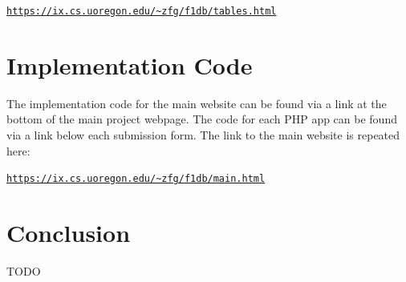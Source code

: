 \documentclass{article} %
\begin{document}
\noindent
\href{https://ix.cs.uoregon.edu/~zfg/f1db/tables.html}{\texttt{https://ix.cs.uoregon.edu/\~{}zfg/f1db/tables.html}}

\section{Implementation Code}

The implementation code for the main website can be found via a link at
the bottom of the main project webpage. The code for each PHP app can be
found via a link below each submission form. The link to the main
website is repeated here:

\noindent
\href{https://ix.cs.uoregon.edu/~zfg/f1db/main.html}{\texttt{https://ix.cs.uoregon.edu/\~{}zfg/f1db/main.html}}


\section{Conclusion}

TODO
\end{document}
